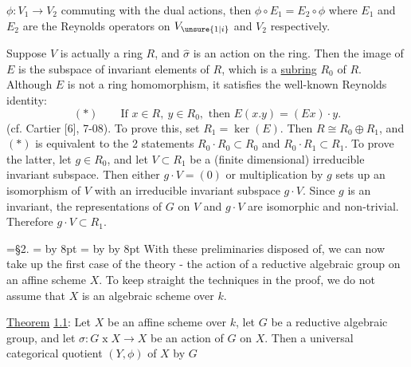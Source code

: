 
$\phi:V_1\longrightarrow V_2$ commuting with the dual actions, then $\phi\circ E_1=E_2\circ\phi$ where $E_1$ and $E_2$ are the Reynolds operators on $V_{\unsure{1|i}}$ and $V_2$ respectively.

Suppose $V$ is actually a ring $R$, and $\hat\sigma$ is an action on the ring. Then the image of $E$ is the subspace of invariant elements of $R$, which is a \uline{subring} $R_0$ of $R$. Although $E$ is not a ring homomorphism, it satisfies the well-known Reynolds identity:
\[
(*)\qquad\text{If }x\in R,\ y\in R_0,\text{ then }E(x.y)=(Ex)\cdot y.
\]
(cf. Cartier\unsure{,} [6], 7-08). To prove this, set $R_1=\ker(E)$. Then $R\cong R_0\oplus R_1$, and $(*)$ is equivalent to the 2 statements $R_0\cdot R_0\subset R_0$ and $R_0\cdot R_1\subset R_1$. To prove the latter, let $g\in R_0$, and let $V\subset R_1$ be a (finite dimensional) irreducible invariant subspace. Then either $g\cdot V=(0)$ or multiplication by $g$ sets up an isomorphism of $V$ with an irreducible invariant subspace $g\cdot V$. Since $g$ is an invariant, the representations of $G$ on $V$ and $g\cdot V$ are isomorphic and non-trivial. Therefore $g\cdot V\subset R_1$.

\begingroup
{}=\hbox{\S2.}
= \advance{} by 8pt
= \advance{} by  \advance{} by 8pt
\leavevmode{}%
\kern4pt\kern4pt\endgroup With these preliminaries disposed of, we can now take up the first case of the theory - the action of a reductive algebraic group on an affine scheme $X$. To keep straight the techniques in the proof, we do not assume that $X$ is an algebraic scheme over $k$.

\uline{Theorem} \uline{1.1}: Let $X$ be an affine scheme over $k$, let $G$ be a reductive algebraic group, and let $\sigma:G\mathbin{x}X\longrightarrow X$ be an action of $G$ on $X$. Then a universal categorical quotient $(Y,\phi)$ of $X$ by $G$

